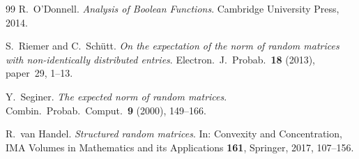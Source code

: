 \documentclass[11pt]{article}
\theoremstyle{definition}
\theoremstyle{remark}
\begin{document}
\begin{thebibliography}{99}
R.~O'Donnell.
\emph{Analysis of Boolean Functions}.
Cambridge University Press, 2014.

S.~Riemer and C.~Sch\"utt.
\emph{On the expectation of the norm of random matrices with
non-identically distributed entries}.
Electron.\ J.\ Probab.\ \textbf{18} (2013), paper~29, 1--13.

Y.~Seginer.
\emph{The expected norm of random matrices}.
Combin.\ Probab.\ Comput.\ \textbf{9} (2000), 149--166.

R.~van Handel.
\emph{Structured random matrices}.
In: Convexity and Concentration, IMA Volumes in Mathematics and its
Applications \textbf{161}, Springer, 2017, 107--156.

\end{thebibliography}
\end{document}
